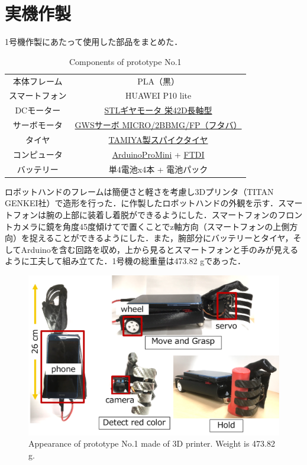 \section{実機作製}
1号機作製にあたって使用した部品をまとめた．

\begin{table}[H]
    \centering
    \caption{Components of prototype No.1}
    \begin{tabular}{cc}\toprule
        本体フレーム & PLA（黒） \\
        スマートフォン & HUAWEI P10 lite \\
        DCモーター & \href{http://akizukidenshi.com/catalog/g/gM-12379/}{STLギヤモータ 栄42D長軸型} \\
        サーボモータ & \href{http://akizukidenshi.com/catalog/g/gM-01908/}{GWSサーボ MICRO/2BBMG/FP（フタバ）} \\ 
        タイヤ & \href{https://tamiya.com/japan/products/70194/index.html}{TAMIYA製スパイクタイヤ} \\ 
        コンピュータ & \href{http://akizukidenshi.com/catalog/g/gK-10347/}{ArduinoProMini} + \href{https://www.switch-science.com/catalog/1032/}{FTDI} \\ 
        バッテリー & 単4電池x4本 + 電池パック \\
        \bottomrule
    \end{tabular} 
    \label{tab:1号機部品}
\end{table}

ロボットハンドのフレームは簡便さと軽さを考慮し3Dプリンタ（TITAN GENKEI社）で造形を行った．に作製したロボットハンドの外観を示す．スマートフォンは腕の上部に装着し着脱ができるようにした．スマートフォンのフロントカメラに鏡を角度45度傾けてで置くことでz軸方向（スマートフォンの上側方向）を捉えることができるようにした．また，腕部分にバッテリーとタイヤ，そしてArduinoを含む回路を収め，上から見るとスマートフォンと手のみが見えるように工夫して組み立てた．1号機の総重量は473.82 gであった．

\begin{figure}
    \centering
    \includegraphics[width=\linewidth]{figure/chapter3/1号機外観}
    \caption{Appearance of prototype No.1 made of 3D printer. Weight is 473.82 g.}
    \label{fig:1号機外観}
\end{figure}


